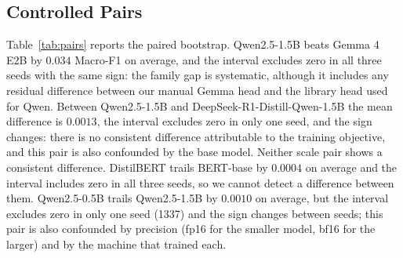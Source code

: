 \subsection{Controlled Pairs}
Table~\ref{tab:pairs} reports the paired bootstrap. Qwen2.5-1.5B beats Gemma 4 E2B by $0.034$ Macro-F1 on average, and the interval excludes zero in all three seeds with the same sign: the family gap is systematic, although it includes any residual difference between our manual Gemma head and the library head used for Qwen. Between Qwen2.5-1.5B and DeepSeek-R1-Distill-Qwen-1.5B the mean difference is $0.0013$, the interval excludes zero in only one seed, and the sign changes: there is no consistent difference attributable to the training objective, and this pair is also confounded by the base model. Neither scale pair shows a consistent difference. DistilBERT trails BERT-base by $0.0004$ on average and the interval includes zero in all three seeds, so we cannot detect a difference between them. Qwen2.5-0.5B trails Qwen2.5-1.5B by $0.0010$ on average, but the interval excludes zero in only one seed (1337) and the sign changes between seeds; this pair is also confounded by precision (fp16 for the smaller model, bf16 for the larger) and by the machine that trained each.

\begin{table}[t]
\centering
\caption{Paired bootstrap over the test set (1,000 resamples, 95\% interval, per seed): mean difference in Macro-F1 of A minus B, number of seeds whose interval excludes zero, and whether the sign is the same in all seeds.}
\label{tab:pairs}
\small

\end{table}

